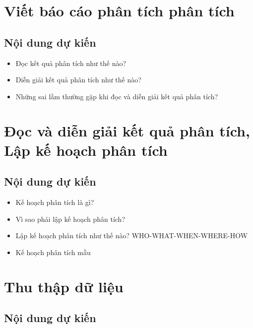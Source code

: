 \documentclass[]{tufte-book}
\providecommand{\tightlist}{%
  \setlength{\itemsep}{0pt}\setlength{\parskip}{0pt}}
\begin{document}
\hypertarget{vit-bao-cao-phan-tich-phan-tich}{%
\chapter{Viết báo cáo phân tích phân tích}\label{vit-bao-cao-phan-tich-phan-tich}}

\hypertarget{ni-dung-d-kin-3}{%
\section{Nội dung dự kiến}\label{ni-dung-d-kin-3}}

\begin{itemize}
\tightlist
\item
  Đọc kết quả phân tích như thế nào?
\item
  Diễn giải kết quả phân tích như thế nào?
\item
  Những sai lầm thường gặp khi đọc và diễn giải kết quả phân tích?
\end{itemize}

\hypertarget{oc-va-din-giai-kt-qua-phan-tich-lp-k-hoach-phan-tich}{%
\chapter{Đọc và diễn giải kết quả phân tích, Lập kế hoạch phân tích}\label{oc-va-din-giai-kt-qua-phan-tich-lp-k-hoach-phan-tich}}

\hypertarget{ni-dung-d-kin-4}{%
\section{Nội dung dự kiến}\label{ni-dung-d-kin-4}}

\begin{itemize}
\tightlist
\item
  Kế hoạch phân tích là gì?
\item
  Vì sao phải lập kế hoạch phân tích?
\item
  Lập kế hoạch phân tích như thế nào? WHO-WHAT-WHEN-WHERE-HOW
\item
  Kế hoạch phân tích mẫu
\end{itemize}

\hypertarget{thu-thp-d-liu}{%
\chapter{Thu thập dữ liệu}\label{thu-thp-d-liu}}

\hypertarget{ni-dung-d-kin-5}{%
\section{Nội dung dự kiến}\label{ni-dung-d-kin-5}}
\end{document}

